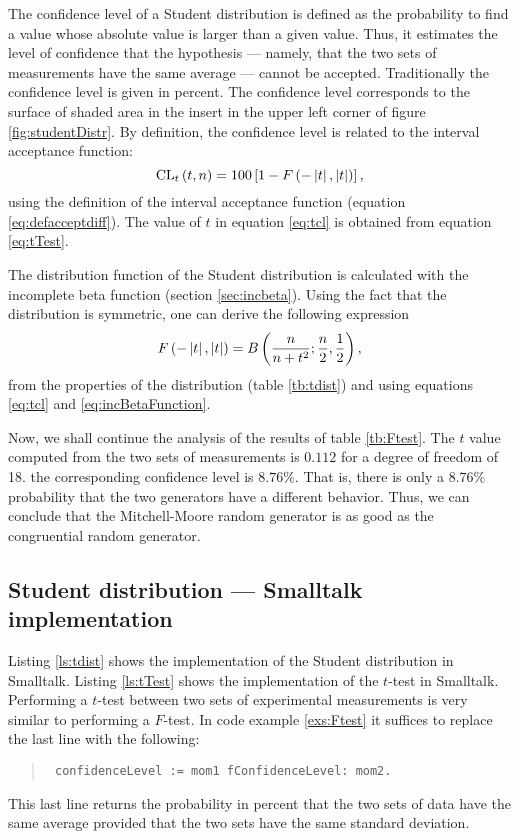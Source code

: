 \documentclass[twoside]{book}
\begin{document}
The confidence level of a Student distribution is defined as the
probability to find a value whose absolute value is larger than a
given value. Thus, it estimates the level of confidence that the
hypothesis --- namely, that the two sets of measurements have the
same average --- cannot be accepted. Traditionally the confidence
level is given in percent. The confidence level corresponds to the
surface of shaded area in the insert in the upper left corner of
figure \ref{fig:studentDistr}. By definition, the confidence level
is related to the interval acceptance function:
\begin{equation}
\label{eq:tcl}
  {\mathop{\rm CL}}_t\left(t,n\right)=100\left[1-
  F\left(-\left|t\right|,\left|t\right|\right)\right],
\end{equation}
using the definition of the interval acceptance function (equation
\ref{eq:defacceptdiff}). The value of $t$ in equation \ref{eq:tcl}
is obtained from equation \ref{eq:tTest}.

The distribution function of the Student distribution is
calculated with the incomplete beta function (\cf section
\ref{sec:incbeta}). Using the fact that the distribution is
symmetric, one can derive the following expression
\begin{equation}
\label{eq:tsymacc}
  F\left(-\left|t\right|,\left|t\right|\right)=B\left({n\over n + t^2};{n\over 2},{1\over
  2}\right),
\end{equation}
from the properties of the distribution (\cf table \ref{tb:tdist})
and using equations \ref{eq:tcl} and \ref{eq:incBetaFunction}.

 Now, we shall continue the analysis of the
results of table \ref{tb:Ftest}. The $t$ value computed from the
two sets of measurements is $0.112$ for a degree of freedom of 18.
the corresponding confidence level is $8.76\%$. That is, there is
only a $8.76\%$ probability that the two generators have a
different behavior. Thus, we can conclude that the Mitchell-Moore
random generator is as good as the congruential random generator.

\subsection{Student distribution --- Smalltalk implementation}
 Listing \ref{ls:tdist} shows the
implementation of the Student distribution in Smalltalk. Listing
\ref{ls:tTest} shows the implementation of the $t$-test in
Smalltalk. Performing a $t$-test between two sets of experimental
measurements is very similar to performing a $F$-test. In code
example \ref{exs:Ftest} it suffices to replace the last line with
the following:
\begin{quote}
\begin{verbatim}
 confidenceLevel := mom1 fConfidenceLevel: mom2.
\end{verbatim}
\end{quote}
This last line returns the probability in percent that the two
sets of data have the same average provided that the two sets have
the same standard deviation.
\end{document}
